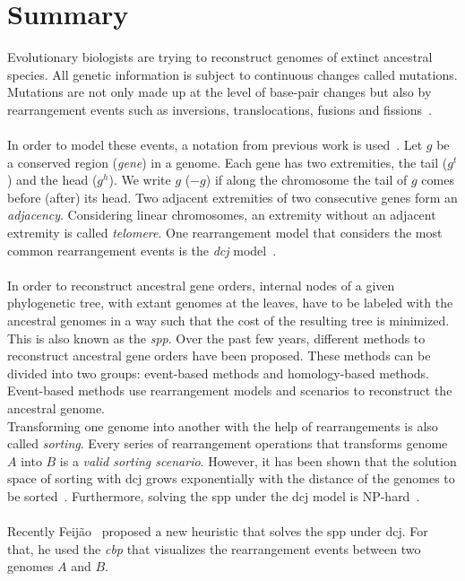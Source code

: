 \chapter{Summary}
Evolutionary biologists are trying to reconstruct genomes of extinct ancestral species.
All genetic information is subject to continuous changes called mutations.
Mutations are not only made up at the level of base-pair changes but also by rearrangement events such as inversions,
translocations, fusions and fissions~\cite{Kent30092003}.
\\ \ \\
In order to model these events, a notation from previous work is used~\cite{Bergeron2006}.
Let $g$ be a conserved region (\emph{gene}) in a genome.
Each gene has two extremities, the tail ($g^t$) and the head ($g^h$).
We write $g$ ($-g$) if along the chromosome the tail of $g$ comes before (after) its head.
Two adjacent extremities of two consecutive genes form an \emph{adjacency}.
Considering linear chromosomes, an extremity without an adjacent extremity is called \emph{telomere}.
One rearrangement model that considers the most common rearrangement events is the \emph{\gls{dcj}} model~\cite{Yancopoulos15082005}.
\\ \ \\
In order to reconstruct ancestral gene orders, internal nodes of a given phylogenetic tree, with extant genomes at the leaves, have to be labeled
with the ancestral genomes in a way such that the cost of the resulting tree is minimized.
This is also known as the \emph{\gls{spp}}. 
Over the past few years, different methods to reconstruct ancestral gene orders have been proposed.
These methods can be divided into two groups: event-based methods and homology-based methods.
Event-based methods use rearrangement models and scenarios to reconstruct the ancestral genome.\\
Transforming one genome into another with the help of rearrangements is also called \emph{sorting}.
Every series of rearrangement operations that transforms genome $A$ into $B$ is a \emph{valid sorting scenario}.
However, it has been shown that the solution space of sorting with \gls{dcj} grows exponentially with the distance of the genomes to be sorted~\cite{Stoye2010}.
Furthermore, solving the \gls{spp} under the \gls{dcj} model is NP-hard~\cite{Tannier2009}.
\\ \ \\
Recently Feijão~\cite{Feijao2015} proposed a new heuristic that solves the \gls{spp} under \gls{dcj}.
For that, he used the \emph{\gls{cbp}} that visualizes the rearrangement events between two genomes $A$ and $B$.
